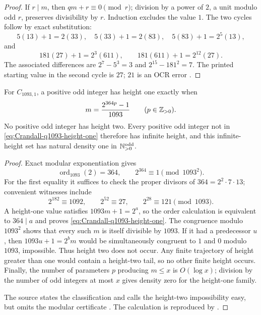 \begin{proof}
If $r\mid m$, then $qm+r\equiv0\pmod r$; division by a power of $2$, a unit
modulo odd $r$, preserves divisibility by $r$.  Induction excludes the value
$1$.  The two cycles follow by exact substitution:
\[
 5(13)+1=2(33),\quad5(33)+1=2(83),\quad5(83)+1=2^5(13),
\]
and
\[
 181(27)+1=2^3(611),\qquad181(611)+1=2^{12}(27).
\]
The associated differences are $2^7-5^3=3$ and
$2^{15}-181^2=7$.  The printed starting value in the second cycle is $27$;
$21$ is an OCR error \cite[p.~1291]{Crandall1978}.
\end{proof}

\begin{proposition}[the omitted finite certificate for $q=1093$]
\label{prop:Crandall-q1093}
For $C_{1093,1}$, a positive odd integer has height one exactly when
\begin{equation}
\label{eq:Crandall-q1093-height-one}
 m=\frac{2^{364p}-1}{1093}
 \qquad(p\in\mathbb{Z}_{>0}).
\end{equation}
No positive odd integer has height two.  Every positive odd integer not in
\eqref{eq:Crandall-q1093-height-one} therefore has infinite height, and this
infinite-height set has natural density one in $\mathbb{N}_{>0}^{\mathrm{odd}}$.
\end{proposition}

\begin{proof}
Exact modular exponentiation gives
\begin{equation}
\label{eq:Crandall-q1093-certificate}
 \operatorname{ord}_{1093}(2)=364,
 \qquad
 2^{364}\equiv1\pmod{1093^2}.
\end{equation}
For the first equality it suffices to check the proper divisors of
$364=2^2\cdot7\cdot13$; convenient witnesses include
\[
 2^{182}\equiv1092,
 \qquad2^{52}\equiv27,
 \qquad2^{28}\equiv121\pmod{1093}.
\]
A height-one value satisfies $1093m+1=2^a$, so the order calculation is
equivalent to $364\mid a$ and proves
\eqref{eq:Crandall-q1093-height-one}.  The congruence modulo $1093^2$ shows
that every such $m$ is itself divisible by $1093$.  If it had a predecessor
$u$, then $1093u+1=2^b m$ would be simultaneously congruent to $1$ and $0$
modulo $1093$, impossible.  Thus height two does not occur.  Any finite
trajectory of height greater than one would contain a height-two tail, so no
other finite height occurs.  Finally, the number of parameters $p$ producing
$m\leq x$ is $O(\log x)$; division by the number of odd integers at most $x$
gives density zero for the height-one family.

The source states the classification and calls the height-two impossibility
easy, but omits the modular certificate
\cite[p.~1291]{Crandall1978}.  The calculation is reproduced by
.
\end{proof}

